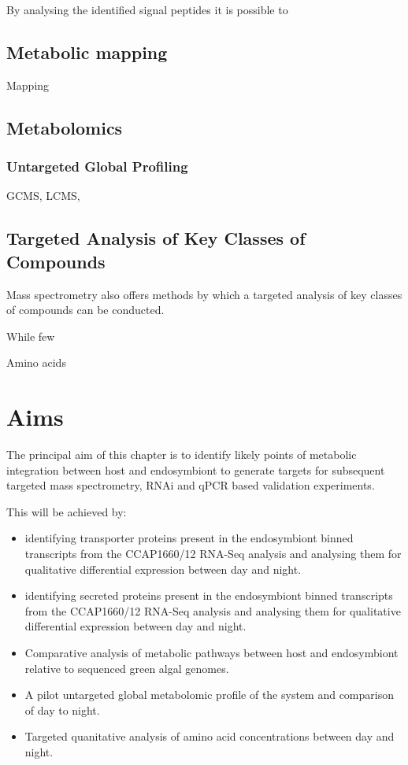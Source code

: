 {{By analysing the identified signal peptides it is possible
to 






    








\subsection{Metabolic mapping}


Mapping 


\subsection{Metabolomics}

\subsubsection{Untargeted Global Profiling}
GCMS, LCMS,

\subsection{Targeted Analysis of Key Classes of Compounds}

Mass spectrometry also offers methods by which a targeted 
analysis of key classes of compounds can be conducted. 


While few

Amino acids 



\section{Aims}

The principal aim of this chapter is to identify
likely points of metabolic integration between host and 
endosymbiont to generate targets for subsequent 
targeted mass spectrometry, RNAi and qPCR based validation
experiments. 

This will be achieved by:
\begin{itemize}
\item identifying
    transporter proteins present in the endosymbiont
    binned transcripts from the CCAP1660/12 RNA-Seq analysis
    and analysing them for qualitative differential 
    expression between day and night. 
\item identifying
    secreted proteins present in the endosymbiont
    binned transcripts from the CCAP1660/12 RNA-Seq analysis
    and analysing them for qualitative differential 
    expression between day and night. 
\item Comparative analysis of metabolic pathways 
    between host and endosymbiont relative to 
    sequenced green algal genomes. 
\item A pilot untargeted global metabolomic profile of the 
    system and comparison of day to night.
\item Targeted quanitative analysis of amino acid concentrations
    between day and night. 
\end{itemize}

}}
